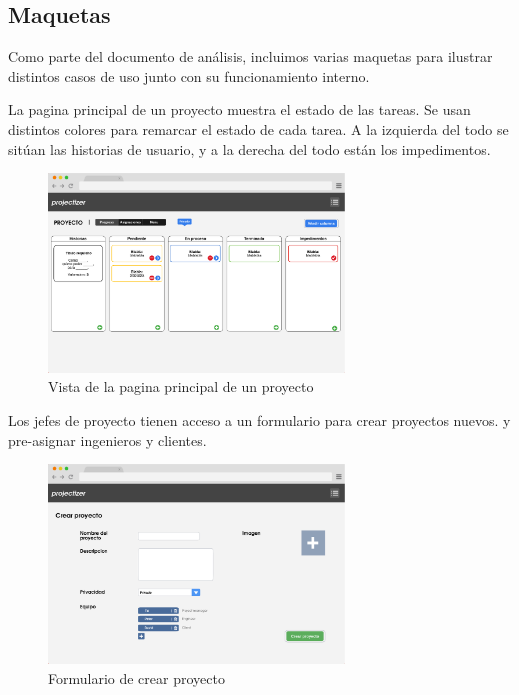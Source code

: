 \documentclass[a4paper, spanish]{article}
\begin{document}
\pagebreak%
\subsection{Maquetas}
Como parte del documento de análisis, incluimos varias maquetas para ilustrar
distintos casos de uso junto con su funcionamiento interno.

La pagina principal de un proyecto muestra el estado de las tareas. Se usan distintos
colores para remarcar el estado de cada tarea. A la izquierda del todo se sitúan las historias de usuario, y a la derecha del todo están los impedimentos.
\begin{figure}[h!]
\centering
\includegraphics[width=0.7\textwidth]{maquetas/home.png}
\caption{Vista de la pagina principal de un proyecto}\label{fig:maquetahome}
\end{figure}

Los jefes de proyecto tienen acceso a un formulario para crear proyectos nuevos.
y pre-asignar ingenieros y clientes.
\begin{figure}[h!]
\centering
\includegraphics[width=0.7\textwidth]{maquetas/proyecto.png}
\caption{Formulario de crear proyecto}\label{fig:maquetaproyecto}
\end{figure}
\end{document}

